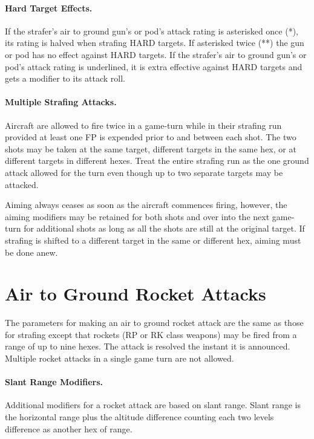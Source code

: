 \paragraph{Hard Target Effects.} If the strafer's air to ground gun's or pod's attack rating is asterisked once (*), its rating is halved when strafing HARD targets. If asterisked twice (**) the gun or pod has no effect against HARD targets. If the strafer's air to ground gun's or pod's attack rating is underlined, it is extra effective against HARD targets and gets a  modifier to its attack roll.

\paragraph{Multiple Strafing Attacks.} Aircraft are allowed to fire twice in a game-turn while in their strafing run provided at least one FP is expended prior to and between each shot. The two shots may be taken at the same target, different targets in the same hex, or at different targets in different hexes. Treat the entire strafing run as the one ground attack allowed for the turn even though up to two separate targets may be attacked.

Aiming always ceases as soon as the aircraft commences firing, however, the aiming modifiers may be retained for both shots and over into the next game-turn for additional shots as long as all the shots are still at the original target. If strafing is shifted to a different target in the same or different hex, aiming must be done anew.

\section{Air to Ground Rocket Attacks}

The parameters for making an air to ground rocket attack are the same as those for strafing except that rockets (RP or RK class weapons) may be fired from a range of up to nine hexes. The attack is resolved the instant it is announced. Multiple rocket attacks in a single game turn are not allowed.

\paragraph{Slant Range Modifiers.} Additional modifiers for a rocket attack are based on slant range. Slant range is the horizontal range plus the altitude difference counting each two levels difference as another hex of range.

